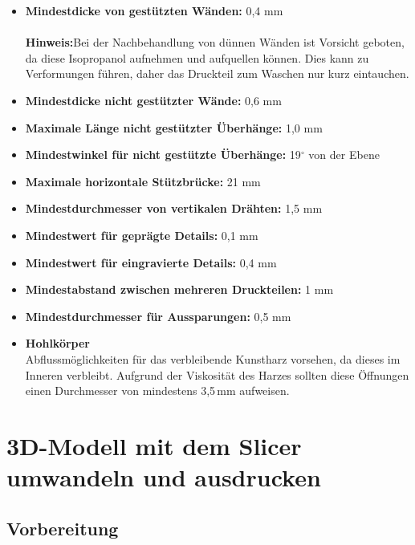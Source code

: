 \documentclass{\basedir/fablab-document}
\begin{document}
\begin{itemize}
    \item \textbf{Mindestdicke von gestützten Wänden:}  0,4 mm\\
        \\
        \textbf{Hinweis:}Bei der Nachbehandlung von dünnen Wänden ist Vorsicht geboten, da diese Isopropanol aufnehmen und aufquellen können. Dies kann zu Verformungen führen, daher das Druckteil zum Waschen nur kurz eintauchen. \\
    \item \textbf{Mindestdicke nicht gestützter Wände:}  0,6 mm
    \item \textbf{Maximale Länge nicht gestützter Überhänge:}  1,0 mm
    \item \textbf{Mindestwinkel für nicht gestützte Überhänge:}  19$^\circ$ von der Ebene
    \item \textbf{Maximale horizontale Stützbrücke:}  21 mm
    \item \textbf{Mindestdurchmesser von vertikalen Drähten:}  1,5 mm
    \item \textbf{Mindestwert für geprägte Details:}  0,1 mm
    \item \textbf{Mindestwert für eingravierte Details:}  0,4 mm
    \item \textbf{Mindestabstand zwischen mehreren Druckteilen:}  1 mm
    \item \textbf{Mindestdurchmesser für Aussparungen:}  0,5 mm
    \item \textbf{Hohlkörper} \\
        Abflussmöglichkeiten für das verbleibende Kunstharz vorsehen, da dieses im Inneren verbleibt. Aufgrund der Viskosität des Harzes sollten diese Öffnungen einen Durchmesser von mindestens 3,5\,mm aufweisen.

\end{itemize}

\newpage


\section{3D-Modell mit dem Slicer umwandeln und ausdrucken}

\subsection{Vorbereitung}
\end{document}

